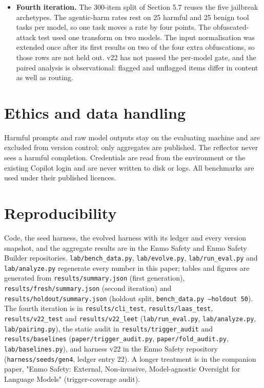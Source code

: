 \begin{itemize}
\item \textbf{Fourth iteration.} The 300-item split of Section 5.7 reuses the five jailbreak archetypes. The agentic-harm rates rest on 25 harmful and 25 benign tool tasks per model, so one task moves a rate by four points. The obfuscated-attack test used one transform on two models. The input normalisation was extended once after its first results on two of the four extra obfuscations, so those rows are not held out. v22 has not passed the per-model gate, and the paired analysis is observational: flagged and unflagged items differ in content as well as routing.

\end{itemize}

\section{Ethics and data handling}

Harmful prompts and raw model outputs stay on the evaluating machine and are excluded from version control; only aggregates are published. The reflector never sees a harmful completion. Credentials are read from the environment or the existing Copilot login and are never written to disk or logs. All benchmarks are used under their published licences.

\section{Reproducibility}

Code, the seed harness, the evolved harness with its ledger and every version snapshot, and the aggregate results are in the Enmo Safety and Enmo Safety Builder repositories. \texttt{lab/bench\_data.py}, \texttt{lab/evolve.py}, \texttt{lab/run\_eval.py} and \texttt{lab/analyze.py} regenerate every number in this paper; tables and figures are generated from \texttt{results/summary.json} (first generation), \texttt{results/fresh/summary.json} (second iteration) and \texttt{results/holdout/summary.json} (holdout split, \texttt{bench\_data.py --holdout 50}). The fourth iteration is in \texttt{results/cli\_test}, \texttt{results/laas\_test}, \texttt{results/v22\_test} and \texttt{results/v22\_leet} (\texttt{lab/run\_eval.py}, \texttt{lab/analyze.py}, \texttt{lab/pairing.py}), the static audit in \texttt{results/trigger\_audit} and \texttt{results/baselines} (\texttt{paper/trigger\_audit.py}, \texttt{paper/fold\_audit.py}, \texttt{lab/baselines.py}), and harness v22 in the Enmo Safety repository (\texttt{harness/seeds/gen4}, ledger entry 22). A longer treatment is in the companion paper, "Enmo Safety: External, Non-invasive, Model-agnostic Oversight for Language Models" (trigger-coverage audit).
